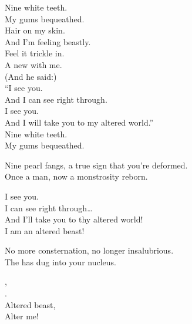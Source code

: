 Nine white teeth. \\
My gums bequeathed. \\

Hair on my skin. \\
And I'm feeling beastly. \\
Feel it trickle in. \\
A new  with me. \\

(And he said:) \\
``I see you. \\
And I can see right through. \\
I see you. \\
And I will take you to my altered world.'' \\

Nine white teeth. \\
My gums bequeathed. \\


Nine pearl fangs, a true sign that you're deformed. \\
Once a man, now a monstrosity reborn. \\


I see you. \\
I can see right through… \\

And I'll take you to thy altered world! \\

I am an altered beast! \\





No more consternation, no longer insalubrious. \\
The   has dug into your nucleus. \\


, \\
. \\
Altered beast, \\
Alter me! \\

